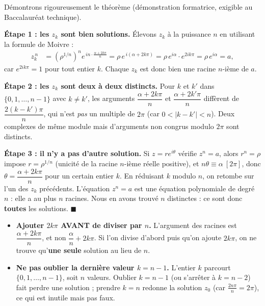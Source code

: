 \documentclass[11pt]{article}
\begin{document}
\begin{experience}
Démontrons rigoureusement le théorème (démonstration formatrice, exigible au Baccalauréat technique).

\textbf{Étape 1 : les $z_k$ sont bien solutions.} Élevons $z_k$ à la puissance $n$ en utilisant la formule de Moivre :
\begin{align*}
z_k^{\,n} &= \left(\rho^{1/n}\right)^n e^{\,i n \cdot \frac{\alpha + 2k\pi}{n}} = \rho\, e^{\,i(\alpha + 2k\pi)} = \rho\, e^{i\alpha} \cdot e^{2ik\pi} = \rho\, e^{i\alpha} = a,
\end{align*}
car $e^{2ik\pi} = 1$ pour tout entier $k$. Chaque $z_k$ est donc bien une racine $n$-ième de $a$.

\textbf{Étape 2 : les $z_k$ sont deux à deux distincts.} Pour $k$ et $k'$ dans $\{0, 1, \dots, n-1\}$ avec $k \neq k'$, les arguments $\dfrac{\alpha + 2k\pi}{n}$ et $\dfrac{\alpha + 2k'\pi}{n}$ diffèrent de $\dfrac{2(k-k')\pi}{n}$, qui n'est \emph{pas} un multiple de $2\pi$ (car $0 < |k - k'| < n$). Deux complexes de même module mais d'arguments non congrus modulo $2\pi$ sont distincts.

\textbf{Étape 3 : il n'y a pas d'autre solution.} Si $z = r e^{i\theta}$ vérifie $z^n = a$, alors $r^n = \rho$ impose $r = \rho^{1/n}$ (unicité de la racine $n$-ième réelle positive), et $n\theta \equiv \alpha \ [2\pi]$, donc $\theta = \dfrac{\alpha + 2k\pi}{n}$ pour un certain entier $k$. En réduisant $k$ modulo $n$, on retombe sur l'un des $z_k$ précédents. L'équation $z^n = a$ est une équation polynomiale de degré $n$ : elle a au plus $n$ racines. Nous en avons trouvé $n$ distinctes : ce sont donc \textbf{toutes} les solutions. $\blacksquare$
\end{experience}

\begin{attention}
\begin{itemize}
\item \textbf{Ajouter $2k\pi$ AVANT de diviser par $n$.} L'argument des racines est $\dfrac{\alpha + 2k\pi}{n}$, et non $\dfrac{\alpha}{n} + 2k\pi$. Si l'on divise d'abord puis qu'on ajoute $2k\pi$, on ne trouve qu'\textbf{une seule} solution au lieu de $n$.
\item \textbf{Ne pas oublier la dernière valeur $k = n-1$.} L'entier $k$ parcourt $\{0, 1, \dots, n-1\}$, soit $n$ valeurs. Oublier $k = n-1$ (ou s'arrêter à $k = n-2$) fait perdre une solution ; prendre $k = n$ redonne la solution $z_0$ (car $\frac{2n\pi}{n} = 2\pi$), ce qui est inutile mais pas faux.
\end{itemize}
\end{attention}
\end{document}
